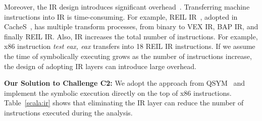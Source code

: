 Moreover, the IR design introduces significant overhead~\cite{217563}.
Transferring machine instructions into IR is time-consuming. For example,
REIL IR~\cite{dullien2009reil}, adopted in CacheS~\cite{236338}, has multiple
transform processes, from binary to VEX IR, BAP IR, and finally REIL IR\@. 
Also, IR increases the total number of instructions. For example, x86
instruction \textit{test eax, eax} transfers into 18 REIL IR instructions. If we
assume the time of symbolically executing grows as the number of instructions increase, the
design of adopting IR layers can introduce large overhead.

\vspace*{2pt}
\textbf{Our Solution to Challenge C2:}
We adopt the approach from QSYM~\cite{217563} and implement the symbolic execution
directly on the top of x86 instructions. Table~\ref{scala:ir} shows that
eliminating the IR layer can reduce the number of instructions executed during
the analysis.

\begin{table}%
      \centering\small\footnotesize
      \caption{The number of x86,  %
             REIL IR, and VEX IR instructions on the traces of crypto programs.}
      \label{scala:ir}
\end{table}

